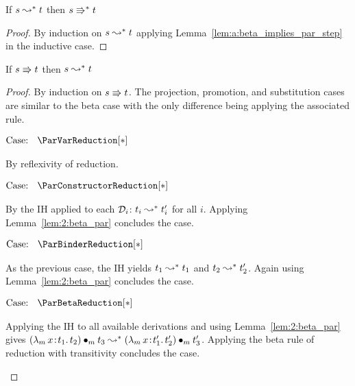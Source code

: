 \begin{lemma}
    If $s \leadsto^* t$ then $s \Rrightarrow^* t$
    \label{lem:a:beta_implies_par}
\end{lemma}
\begin{proof}
    By induction on $s \leadsto^* t$ applying Lemma~\ref{lem:a:beta_implies_par_step} in the inductive case.
\end{proof}

\begin{lemma}
    If $s \Rrightarrow t$ then $s \leadsto^* t$
    \label{lem:a:par_implies_beta_step}
\end{lemma}
\begin{proof}
    By induction on $s \Rrightarrow t$.
    The projection, promotion, and substitution cases are similar to the beta case with the only difference being applying the associated rule.

    $\text{Case: }\begin{array}{c} \ParVarReduction[*] \end{array}$
    \begin{proofcase}
        By reflexivity of reduction.
    \end{proofcase}

    $\text{Case: }\begin{array}{c} \ParConstructorReduction[*] \end{array}$
    \begin{proofcase}
        By the IH applied to each $\mathcal{D}_{i}$: $t_i \leadsto^* t_i^\prime$ for all $i$.
        Applying Lemma~\ref{lem:2:beta_par} concludes the case.
    \end{proofcase}

    $\text{Case: }\begin{array}{c} \ParBinderReduction[*] \end{array}$
    \begin{proofcase}
        As the previous case, the IH yields $t_1 \leadsto^* t_1$ and $t_2 \leadsto^* t_2^\prime$.
        Again using Lemma~\ref{lem:2:beta_par} concludes the case.
    \end{proofcase}

    $\text{Case: }\begin{array}{c} \ParBetaReduction[*] \end{array}$
    \begin{proofcase}
        Applying the IH to all available derivations and using Lemma~\ref{lem:2:beta_par} gives $({\lambda_m}\, x\! : \! t_1.\, t_2) \bullet_{m} t_3 \leadsto^* ({\lambda_m}\, x\! : \! t_1^\prime.\, t_2^\prime) \bullet_{m} t_3^\prime$.
        Applying the beta rule of reduction with transitivity concludes the case.
    \end{proofcase}
\end{proof}


